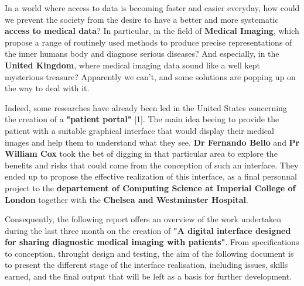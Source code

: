 In a world where access to data is becoming faster and easier everyday, how could we prevent the society from the desire to have a better and more systematic \textbf{access to medical data}? In particular, in the field of \textbf{Medical Imaging}, which propose a range of routinely used methods to produce precise representations of the inner humans body and diagnose serious diseases? And especially, in the \textbf{United Kingdom}, where medical imaging data sound like a well kept mysterious treasure? Apparently we can't, and some solutions are popping up on the way to deal with it.

\newline \vspace{5mm}
Indeed, some researches have already been led in the United States concerning the creation of a \textbf{"patient portal"} [1]. The main idea beeing to provide the patient with a suitable graphical interface that would display their medical images and help them to understand what they see. \textbf{Dr Fernando Bello} and \textbf{Pr William Cox} took the bet of digging in that particular area to explore the benefits and risks that could come from the conception of such an interface. They ended up to propose the effective realization of this interface, as a final personnal project to the \textbf{departement of Computing Science at Imperial College of London} together with the \textbf{Chelsea and Westminster Hospital}. 

\newline \vspace{5mm}
Consequently, the following report offers an overview of the work undertaken during the last three month on the creation of \textbf{"A digital interface designed for sharing diagnostic medical imaging with patients"}. From specifications to conception, throught design and testing, the aim of the following document is to present the different stage of the interface realisation, including issues, skills earned, and the final output that will be left as a basis for further development.





